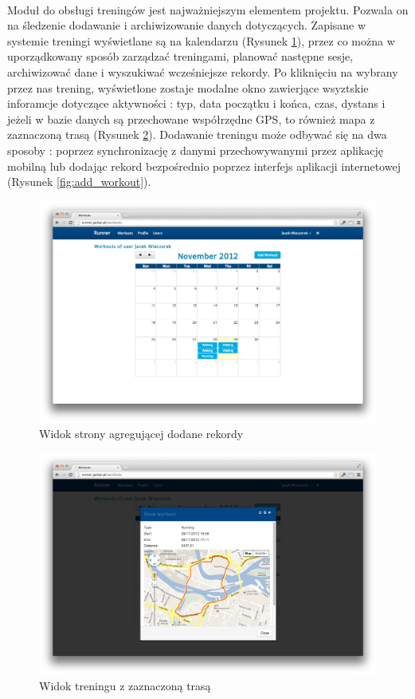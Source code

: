 \paragraph{}
Moduł do obsługi treningów jest najważniejszym elementem projektu. Pozwala on na śledzenie dodawanie i archiwizowanie danych dotyczących. Zapisane w systemie treningi wyświetlane są na kalendarzu (Rysunek \ref{fig:workout_main}), przez co można w uporządkowany sposób zarządzać treningami, planować następne sesje, archiwizować dane i wyszukiwać wcześniejsze rekordy. Po kliknięciu na wybrany przez nas trening, wyświetlone zostaje modalne okno zawierjące wsyztskie inforamcje dotyczące aktywności : typ, data początku i końca, czas, dystans i jeżeli w bazie danych są przechowane współrzędne GPS, to również mapa z zaznaczoną trasą (Rysunek \ref{fig:workout_map}). Dodawanie treningu może odbywać się na dwa sposoby : poprzez synchronizację z danymi przechowywanymi przez aplikację mobilną lub dodając rekord bezpośrednio poprzez interfejs aplikacji internetowej (Rysunek \ref{fig:add_workout}).


\begin{figure}[ht]
	\centering
		\includegraphics[width=1\linewidth]{assets/workouts_main.png}
	\caption{Widok strony agregującej dodane rekordy}
	\label{fig:workout_main}
\end{figure}

\begin{figure}[ht]
	\centering
		\includegraphics[width=1\linewidth]{assets/workout_map.png}
	\caption{Widok treningu z zaznaczoną trasą}
	\label{fig:workout_map}
\end{figure}

